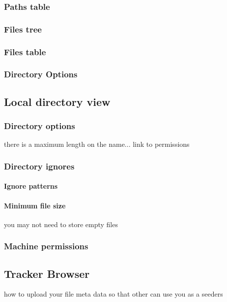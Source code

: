 \documentclass{article}
\begin{document}
\subsubsection{Paths table}
\subsubsection{Files tree}
\subsubsection{Files table}
\subsubsection{Directory Options}

\subsection{Local directory view}

\subsubsection{Directory options}

there is a maximum length on the name...
link to permissions
\subsubsection{Directory ignores}
\paragraph{Ignore patterns}

\paragraph{Minimum file size}
you may not need to store empty files

\subsubsection{Machine permissions}

\subsection{Tracker Browser}

how to upload your file meta data so that other can use you as a seeders
\end{document}
